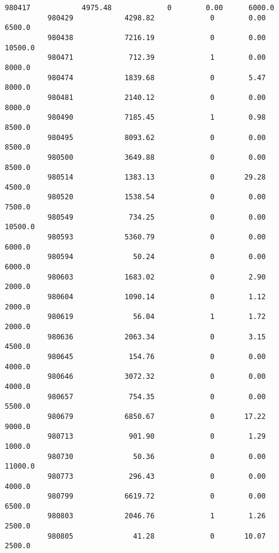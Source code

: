 \documentclass[11pt]{article}
\begin{document}
\begin{Verbatim}[commandchars=\\\{\}]
          980417            4975.48             0        0.00      6000.0   
          980429            4298.82             0        0.00      6500.0   
          980438            7216.19             0        0.00     10500.0   
          980471             712.39             1        0.00      8000.0   
          980474            1839.68             0        5.47      8000.0   
          980481            2140.12             0        0.00      8000.0   
          980490            7185.45             1        0.98      8500.0   
          980495            8093.62             0        0.00      8500.0   
          980500            3649.88             0        0.00      8500.0   
          980514            1383.13             0       29.28      4500.0   
          980520            1538.54             0        0.00      7500.0   
          980549             734.25             0        0.00     10500.0   
          980593            5360.79             0        0.00      6000.0   
          980594              50.24             0        0.00      6000.0   
          980603            1683.02             0        2.90      2000.0   
          980604            1090.14             0        1.12      2000.0   
          980619              56.04             1        1.72      2000.0   
          980636            2063.34             0        3.15      4500.0   
          980645             154.76             0        0.00      4000.0   
          980646            3072.32             0        0.00      4000.0   
          980657             754.35             0        0.00      5500.0   
          980679            6850.67             0       17.22      9000.0   
          980713             901.90             0        1.29      1000.0   
          980730              50.36             0        0.00     11000.0   
          980773             296.43             0        0.00      4000.0   
          980799            6619.72             0        0.00      6500.0   
          980803            2046.76             1        1.26      2500.0   
          980805              41.28             0       10.07      2500.0   
          

\end{Verbatim}
\end{document}
